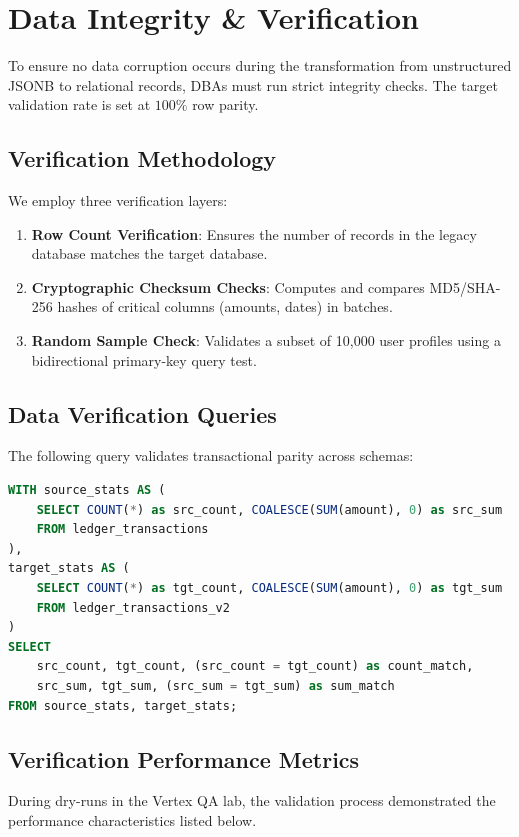 \section{Data Integrity \& Verification}

To ensure no data corruption occurs during the transformation from unstructured JSONB to relational records, DBAs must run strict integrity checks. The target validation rate is set at $100\%$ row parity.

\subsection{Verification Methodology}
We employ three verification layers:
\begin{enumerate}
    \item \textbf{Row Count Verification}: Ensures the number of records in the legacy database matches the target database.
    \item \textbf{Cryptographic Checksum Checks}: Computes and compares MD5/SHA-256 hashes of critical columns (amounts, dates) in batches.
    \item \textbf{Random Sample Check}: Validates a subset of 10,000 user profiles using a bidirectional primary-key query test.
\end{enumerate}

\subsection{Data Verification Queries}
The following query validates transactional parity across schemas:

\begin{lstlisting}[language=sql, caption={Query to verify primary keys and transaction values match.}]
WITH source_stats AS (
    SELECT COUNT(*) as src_count, COALESCE(SUM(amount), 0) as src_sum
    FROM ledger_transactions
),
target_stats AS (
    SELECT COUNT(*) as tgt_count, COALESCE(SUM(amount), 0) as tgt_sum
    FROM ledger_transactions_v2
)
SELECT 
    src_count, tgt_count, (src_count = tgt_count) as count_match,
    src_sum, tgt_sum, (src_sum = tgt_sum) as sum_match
FROM source_stats, target_stats;
\end{lstlisting}

\subsection{Verification Performance Metrics}
During dry-runs in the Vertex QA lab, the validation process demonstrated the performance characteristics listed below.

